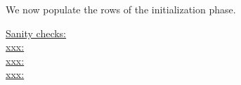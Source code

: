 
We now populate the rows of the initialization phase.
\begin{description}
	\item[\underline{\underline{Sanity checks:}}]
	\item[\underline{\underline{xxx:}}]
	\item[\underline{\underline{xxx:}}]
	\item[\underline{\underline{xxx:}}]
		
\end{description}
